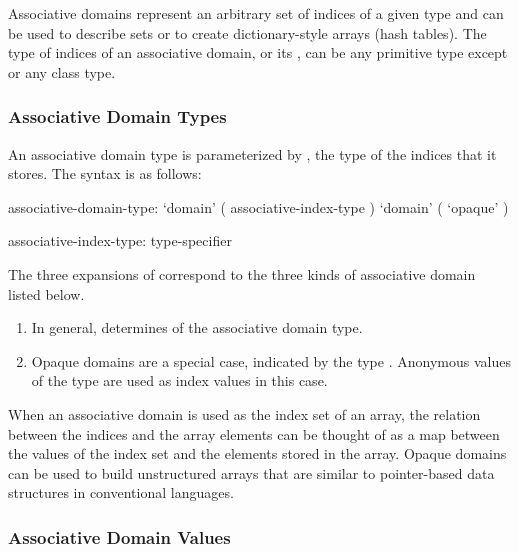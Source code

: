Associative domains represent an arbitrary set of indices
of a given type and can be used to describe sets or to create
dictionary-style arrays (hash tables).
The type of indices of an associative domain, or its ,
can be any primitive type except  or any class type.

\subsubsection{Associative Domain Types}

\label{Associative_Domain_Types}

An associative domain type is parameterized by , the
type of the indices that it stores.  The syntax is as follows:

\begin{syntax}
associative-domain-type:
  `domain' ( associative-index-type )
  `domain' ( `opaque' )

associative-index-type:
  type-specifier
\end{syntax}

The three expansions of  correspond to the three
kinds of associative domain listed below.
\begin{enumerate} 
\item In general,  determines 
of the associative domain type.
\item Opaque domains are a special case, indicated by the type .
Anonymous values of the type  are used as index values
in this case.
\end{enumerate}

When an associative domain is used as the index set of an array, the relation
between the indices and the array elements can be thought of as a map between
the values of the index set and the elements stored in the array.
Opaque domains can be used to build unstructured arrays that are similar to
pointer-based data structures in conventional languages.

\subsubsection{Associative Domain Values}
\label{Associative_Domain_Values}

